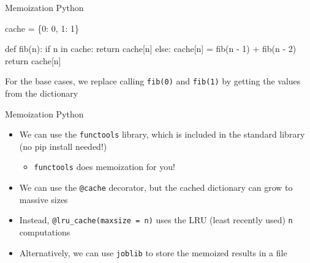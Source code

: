 \documentclass[
  ignorenonframetext,
]{beamer}
\newenvironment{Shaded}{\begin{snugshade}}{\end{snugshade}}
\newcommand{\ControlFlowTok}[1]{\textcolor[rgb]{0.00,0.23,0.31}{#1}}
\newcommand{\DecValTok}[1]{\textcolor[rgb]{0.68,0.00,0.00}{#1}}
\newcommand{\KeywordTok}[1]{\textcolor[rgb]{0.00,0.23,0.31}{#1}}
\newcommand{\NormalTok}[1]{\textcolor[rgb]{0.00,0.23,0.31}{#1}}
\newcommand{\OperatorTok}[1]{\textcolor[rgb]{0.37,0.37,0.37}{#1}}
\providecommand{\tightlist}{%
  \setlength{\itemsep}{0pt}\setlength{\parskip}{0pt}}\usepackage{longtable,booktabs,array}
\begin{document}
\begin{frame}[fragile]{Memoization Python}
\protect\hypertarget{memoization-python}{}
\begin{Shaded}
\begin{Highlighting}[]
\NormalTok{cache }\OperatorTok{=}\NormalTok{ \{}\DecValTok{0}\NormalTok{: }\DecValTok{0}\NormalTok{, }\DecValTok{1}\NormalTok{: }\DecValTok{1}\NormalTok{\}}

\KeywordTok{def}\NormalTok{ fib(n):}
  \ControlFlowTok{if}\NormalTok{ n }\KeywordTok{in}\NormalTok{ cache:}
    \ControlFlowTok{return}\NormalTok{ cache[n]}
  \ControlFlowTok{else}\NormalTok{:}
\NormalTok{    cache[n] }\OperatorTok{=}\NormalTok{ fib(n }\OperatorTok{{-}} \DecValTok{1}\NormalTok{) }\OperatorTok{+}\NormalTok{ fib(n }\OperatorTok{{-}} \DecValTok{2}\NormalTok{)}
    \ControlFlowTok{return}\NormalTok{ cache[n]}
\end{Highlighting}
\end{Shaded}

For the base cases, we replace calling \texttt{fib(0)} and
\texttt{fib(1)} by getting the values from the dictionary
\end{frame}

\begin{frame}[fragile]{Memoization Python}
\protect\hypertarget{memoization-python-1}{}
\begin{itemize}
\item
  We can use the \texttt{functools} library, which is included in the
  standard library (no pip install needed!)

  \begin{itemize}
  \tightlist
  \item
    \texttt{functools} does memoization for you!
  \end{itemize}
\item
  We can use the \texttt{@cache} decorator, but the cached dictionary
  can grow to massive sizes
\item
  Instead, \texttt{@lru\_cache(maxsize\ =\ n)} uses the LRU (least
  recently used) \texttt{n} computations
\item
  Alternatively, we can use \texttt{joblib} to store the memoized
  results in a file
\end{itemize}
\end{frame}
\end{document}
